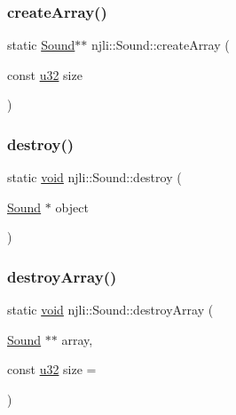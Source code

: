 \subsubsection{\texorpdfstring{create\+Array()}{createArray()}}
{\footnotesize\ttfamily static \mbox{\hyperlink{classnjli_1_1_sound}{Sound}}$\ast$$\ast$ njli\+::\+Sound\+::create\+Array (\begin{DoxyParamCaption}\item[{const \mbox{\hyperlink{_util_8h_a10e94b422ef0c20dcdec20d31a1f5049}{u32}}}]{size }\end{DoxyParamCaption})\hspace{0.3cm}{\ttfamily [static]}}

\mbox{\label{classnjli_1_1_sound_a023bb75371ded2019f650dfa8b6e03f6}} 
\subsubsection{\texorpdfstring{destroy()}{destroy()}}
{\footnotesize\ttfamily static \mbox{\hyperlink{_thread_8h_af1e856da2e658414cb2456cb6f7ebc66}{void}} njli\+::\+Sound\+::destroy (\begin{DoxyParamCaption}\item[{\mbox{\hyperlink{classnjli_1_1_sound}{Sound}} $\ast$}]{object }\end{DoxyParamCaption})\hspace{0.3cm}{\ttfamily [static]}}

\mbox{\label{classnjli_1_1_sound_af1810cb796cda9c9d84ba28f3a0d8ddf}} 
\subsubsection{\texorpdfstring{destroy\+Array()}{destroyArray()}}
{\footnotesize\ttfamily static \mbox{\hyperlink{_thread_8h_af1e856da2e658414cb2456cb6f7ebc66}{void}} njli\+::\+Sound\+::destroy\+Array (\begin{DoxyParamCaption}\item[{\mbox{\hyperlink{classnjli_1_1_sound}{Sound}} $\ast$$\ast$}]{array,  }\item[{const \mbox{\hyperlink{_util_8h_a10e94b422ef0c20dcdec20d31a1f5049}{u32}}}]{size = {} }\end{DoxyParamCaption})\hspace{0.3cm}{\ttfamily [static]}}


